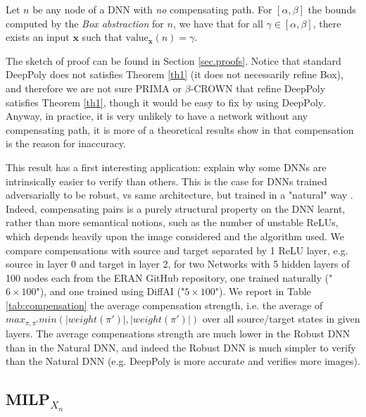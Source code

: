 \documentclass{llncs}
\newcommand{\vx}{\boldsymbol{x}}
\newcommand{\val}{{\textrm{value}}}
\begin{document}
\begin{theorem}
	\label{th1}
	Let $n$ be any node of a DNN with {\em no} compensating path. For $[\alpha,\beta]$ the bounds computed by the {\em Box abstraction} for $n$, we have that for all $\gamma \in [\alpha,\beta]$, there exists an input $\vx$ such that $\val_{\vx}(n)=\gamma$.
\end{theorem}


The sketch of proof can be found in Section \ref{sec.proofs}. 
Notice that standard DeepPoly does not satisfies Theorem \ref{th1} (it does not necessarily refine Box), and therefore we are not sure PRIMA or $\beta$-CROWN that refine DeepPoly satisfies Theorem \ref{th1}, though it would be easy to fix by using $\overline{\text{DeepPoly}}$. Anyway, in practice, it is very unlikely to have a network without any compensating path, it is more of a theoretical results show in that compensation is the reason for inaccuracy.

This result has a first interesting application: explain why some DNNs are intrinsically easier to verify than others. This is the case for DNNs trained adversarially to be robust, vs same architecture, but trained in a "natural" way \cite{deeppoly,prima,crown}. Indeed, compensating pairs is a purely structural property on the DNN learnt, rather than more semantical notions, such as the number of unstable ReLUs, which depends heavily upon the image considered and the algorithm used. We compare compensations with source and target separated by 1 ReLU layer, e.g. source in layer 0 and target in layer 2, for two Networks with 5 hidden layers of 100 nodes each from the ERAN GitHub repository, one trained naturally ("$6\times100$"), 
and one trained using DiffAI ("$5\times100$"). 
We report in Table \ref{tab:compensation} the average compensation strength, i.e. 
the average of $max_{\pi,\pi'} min(|weight(\pi')|,|weight(\pi')|)$
over all source/target states in given layers. The average compensations strength are much lower in the Robust DNN than in the Natural DNN, and indeed the Robust DNN is much simpler to verify than the Natural DNN (e.g. DeepPoly is more accurate and verifies more images).


\subsection{MILP$_{X_n}$}
\end{document}
